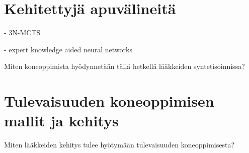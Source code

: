 \documentclass[finnish,twoside,censored,subject,sw-line]{HYthesisML}
\begin{document}
\chapter{Kehitettyjä apuvälineitä}

- 3N-MCTS~\cite{SeglerMarwinHS2018Pcsw}

- expert knowledge aided neural networks~\cite{10.1145/3450439.3451879}

Miten koneoppimista hyödynnetään tällä hetkellä lääkkeiden syntetisoinnissa? ~\cite{SeglerMarwinHS2018Pcsw,10.1145/3219819.3219882,10.1145/3450439.3451879}

\chapter{Tulevaisuuden koneoppimisen mallit ja kehitys}

Miten lääkkeiden kehitys tulee hyötymään tulevaisuuden koneoppimisesta?~\cite{ButlerKeithT2018Mlfm}

\cleardoublepage                          %
{}  %
\printbibliography

\backmatter
\end{document}

